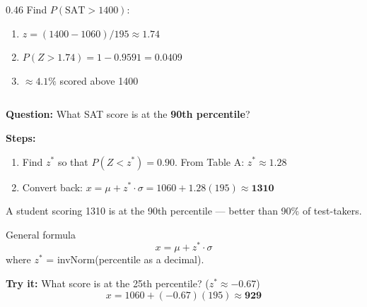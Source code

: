 \documentclass[aspectratio=169, 11pt]{beamer}
\begin{document}
{\begin{frame}[t, plain]
\begin{minipage}{0.9\textwidth}
\begin{columns}[T]
\begin{column}{0.46\textwidth}
        \vspace{0.4em}
        Find $P(\text{SAT} > 1400)$:
        \begin{enumerate}
          \setlength{\itemsep}{0.3em}
          \item $z = (1400-1060)/195 \approx 1.74$
          \item $P(Z > 1.74) = 1 - 0.9591 = 0.0409$
          \item $\approx 4.1\%$ scored above 1400
        \end{enumerate}
      \end{column}
    \end{columns}
  \end{minipage}
\end{frame}
}

{
\begin{frame}[t, plain]
  \vspace{0.8em}%
  \hspace{0.55cm}%
  \begin{minipage}{0.9\textwidth}
    \small
    \textbf{Question:} What SAT score is at the \textbf{90th percentile}?

    \vspace{0.4em}
    \textbf{Steps:}
    \begin{enumerate}
      \setlength{\itemsep}{0.5em}
      \item Find $z^*$ so that $P(Z < z^*) = 0.90$. \quad
            From Table A: $z^* \approx 1.28$
      \item Convert back: \quad $x = \mu + z^* \cdot \sigma = 1060 + 1.28(195) \approx \mathbf{1310}$
    \end{enumerate}

    \vspace{0.5em}
    A student scoring 1310 is at the 90th percentile — better than 90\% of test-takers.

    \vspace{0.5em}
    \begin{block}{General formula}
      \[
        x = \mu + z^* \cdot \sigma
      \]
      where $z^*$ = invNorm(percentile as a decimal).
    \end{block}

    \vspace{0.4em}
    \textbf{Try it:} What score is at the 25th percentile? ($z^* \approx -0.67$)
    \[
      x = 1060 + (-0.67)(195) \approx \mathbf{929}
    \]
  \end{minipage}
\end{frame}
}
\end{document}
